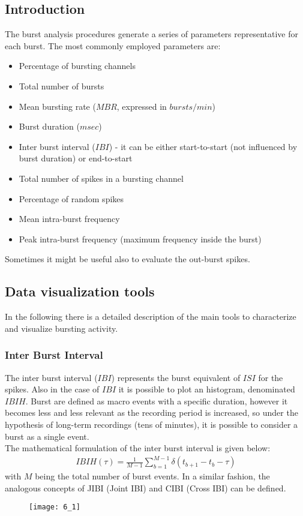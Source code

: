 \subsection{Introduction}
The burst analysis procedures generate a series of parameters representative for
each burst. The most commonly employed parameters are:
\begin{itemize}
    \item Percentage of bursting channels
    \item Total number of bursts
    \item Mean bursting rate (\(MBR\), expressed in \(bursts/min\))
    \item Burst duration (\(msec\))
    \item Inter burst interval (\(IBI\)) - it can be either start-to-start (not
          influenced by burst duration) or end-to-start
    \item Total number of spikes in a bursting channel
    \item Percentage of random spikes
    \item Mean intra-burst frequency
    \item Peak intra-burst frequency (maximum frequency inside the burst)
\end{itemize}
Sometimes it might be useful also to evaluate the out-burst spikes.

\subsection{Data visualization tools}
In the following there is a detailed description of the main tools to characterize and
visualize bursting activity.

\subsubsection{Inter Burst Interval}
The inter burst interval (\(IBI\)) represents the burst equivalent of \(ISI\) for the spikes. Also in the case of \(IBI\) it is possible to plot an histogram, denominated \(IBIH\). Burst are defined as macro events with a specific duration, however it becomes less and less relevant as the recording period is increased, so under the hypothesis of long-term recordings (tens of minutes), it is possible to consider a burst as a single event.\\
The mathematical formulation of the inter burst interval is given below:
\begin{align*}
    IBIH(\tau)=\frac{1}{M-1}\sum_{b=1}^{M-1}\delta(t_{b+1}-t_{b}-\tau)
\end{align*}
with \(M\) being the total number of burst events.
In a similar fashion, the analogous concepts of JIBI (Joint IBI) and CIBI (Cross IBI) can be defined.
\begin{figure}[H]
    \texttt{[image: 6\_1]}
    \centering
\end{figure}

